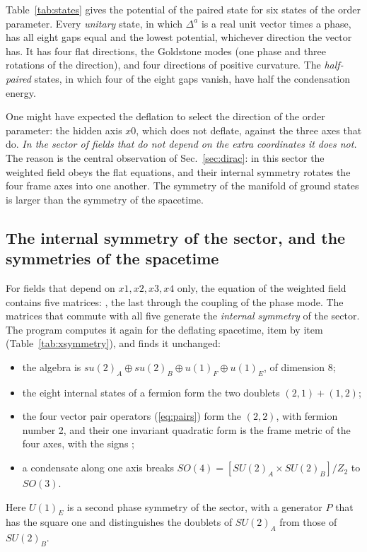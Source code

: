 Table~\ref{tab:states} gives the potential of the paired state for six states of the order
parameter. Every \emph{unitary} state, in which $\Delta^{a}$ is a real unit vector times a phase, has
all eight gaps equal and the lowest potential, whichever direction the vector has. It has four flat
directions, the Goldstone modes (one phase and three rotations of the direction), and four
directions of positive curvature. The \emph{half-paired} states, in which four of the eight gaps
vanish, have half the condensation energy.

One might have expected the deflation to select the direction of the order parameter: the hidden
axis $x0$, which does not deflate, against the three axes that do. \emph{In the sector of fields
that do not depend on the extra coordinates it does not.} The reason is the central observation of
Sec.~\ref{sec:dirac}: in this sector the weighted field obeys the flat equations, and their internal
symmetry rotates the four frame axes into one another. The symmetry of the manifold of ground states
is larger than the symmetry of the spacetime.

\subsection{The internal symmetry of the sector, and the symmetries of the spacetime}
\label{sec:hidden}

For fields that depend on $x1,x2,x3,x4$ only, the equation of the weighted field contains five
matrices: , the last through the coupling of the phase mode. The matrices that commute
with all five generate the \emph{internal symmetry} of the sector. The program computes it again for
the deflating spacetime, item by item (Table~\ref{tab:xsymmetry}), and finds it unchanged:
\begin{itemize}
\item the algebra is $su(2)_A\oplus su(2)_B\oplus u(1)_F\oplus u(1)_E$, of dimension 8;
\item the eight internal states of a fermion form the two doublets $(2,1)+(1,2)$;
\item the four vector pair operators (\ref{eq:pairs}) form the $(2,2)$, with fermion number 2, and
their one invariant quadratic form is the frame metric of the four axes, with the signs
;
\item a condensate along one axis breaks $SO(4)=[SU(2)_A\times SU(2)_B]/Z_2$ to $SO(3)$.
\end{itemize}
Here $U(1)_E$ is a second phase symmetry of the sector, with a generator $P$ that has the square one
and distinguishes the doublets of $SU(2)_A$ from those of $SU(2)_B$.

